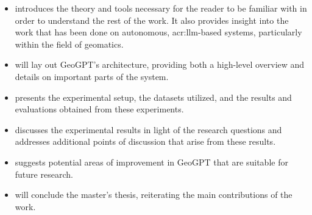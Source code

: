 \begin{itemize}
    \item {} introduces the theory and tools necessary for the reader to be familiar with in order to understand the rest of the work. It also provides insight into the work that has been done on autonomous, \acrshort{acr:llm}-based systems, particularly within the field of geomatics.
    \item {} will lay out GeoGPT's architecture, providing both a high-level overview and details on important parts of the system.
    \item {} presents the experimental setup, the datasets utilized, and the results and evaluations obtained from these experiments.
    \item {} discusses the experimental results in light of the research questions and addresses additional points of discussion that arise from these results.
    \item {} suggests potential areas of improvement in GeoGPT that are suitable for future research.
    \item {} will conclude the master's thesis, reiterating the main contributions of the work.
\end{itemize}


\glsresetall